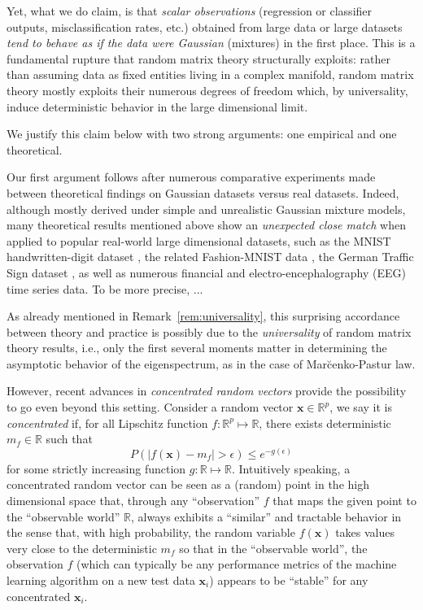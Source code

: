 \documentclass[MAL,biber]{nowfnt} %
\newcommand{\x}{{\mathbf{x}}}
\newcommand{\RR}{{\mathbb{R}}}
\begin{document}
Yet, what we do claim, is that \emph{scalar observations} (regression or classifier outputs, misclassification rates, etc.) obtained from large data or large datasets \emph{tend to behave as if the data were Gaussian} (mixtures) in the first place. This is a fundamental rupture that random matrix theory structurally exploits: rather than assuming data as fixed entities living in a complex manifold, random matrix theory mostly exploits their numerous degrees of freedom which, by universality, induce deterministic behavior in the large dimensional limit.

We justify this claim below with two strong arguments: one empirical and one theoretical.

\bigskip

Our first argument follows after numerous comparative experiments made between theoretical findings on Gaussian datasets versus real datasets. Indeed, although mostly derived under simple and unrealistic Gaussian mixture models, many theoretical results mentioned above show an \emph{unexpected close match} when applied to popular real-world large dimensional datasets, such as the MNIST handwritten-digit dataset \citep{lecun1998gradient}, the related Fashion-MNIST data \citep{xiao2017fashion}, the German Traffic Sign dataset \citep{houben2013German}, as well as numerous financial and electro-encephalography (EEG) time series data. To be more precise, ...


As already mentioned in Remark~\ref{rem:universality}, this surprising accordance between theory and practice is possibly due to the \emph{universality} of random matrix theory results, i.e., only the first several moments matter in determining the asymptotic behavior of the eigenspectrum, as in the case of Mar{\u c}enko-Pastur law. 


However, recent advances in \emph{concentrated random vectors} \citep{el2009concentration,louart2019concentration} provide the possibility to go even beyond this setting. Consider a random vector $\x \in \RR^p$, we say it is \emph{concentrated} if, for all Lipschitz function $f: \RR^p \mapsto \RR$, there exists deterministic $m_f \in \RR$ such that
\begin{equation*}
    P \left( | f(\x) - m_f | > \epsilon \right) \le e^{-g(\epsilon)}
\end{equation*}
for some strictly increasing function $g: \RR \mapsto \RR$. Intuitively speaking, a concentrated random vector can be seen as a (random) point in the high dimensional space that, through any ``observation'' $f$ that maps the given point to the ``observable world'' $\RR$, always exhibits a ``similar'' and tractable behavior in the sense that, with high probability, the random variable $f(\x)$ takes values very close to the deterministic $m_f$ so that in the ``observable world'', the observation $f$ (which can typically be any performance metrics of the machine learning algorithm on a new test data $\x_i$) appears to be ``stable'' for any concentrated $\x_i$. 
\end{document}
